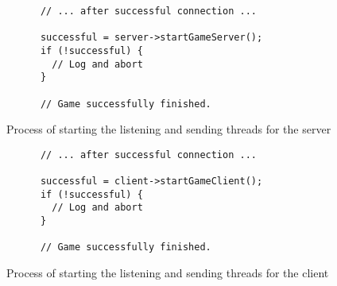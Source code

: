 \begin{figure}[!h]
  \centering
  \begin{lstlisting}
      // ... after successful connection ...

      successful = server->startGameServer();
      if (!successful) {
        // Log and abort
      }

      // Game successfully finished.
  \end{lstlisting}
  \caption{Process of starting the listening and sending threads for the server}
  \label{code:server_game}
\end{figure}

\begin{figure}[!h]
  \centering
  \begin{lstlisting}
      // ... after successful connection ...

      successful = client->startGameClient();
      if (!successful) {
        // Log and abort
      }

      // Game successfully finished.
  \end{lstlisting}
  \caption{Process of starting the listening and sending threads for the client}
  \label{code:client_game}
\end{figure}
